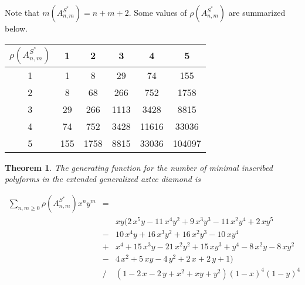 \documentclass[12pt]{article}
\newtheorem{theorem}{Theorem}
\theoremstyle{plain}
\theoremstyle{definition}
\theoremstyle{remark}
\theoremstyle{definition}
\begin{document}
Note that $m(A^{S^*}_{n,m}) = n+m+2$. Some values of $\rho(A^{S^*}_{n,m})$ are summarized below.

\begin{table}[h]
    \centering
    \begin{tabular}{|c|c|c|c|c|c|}
        \hline
        $\rho(A^{S^*}_{n,m})$ & 1 & 2 & 3 & 4 & 5 \\
        \hline
        1 & 1 & 8 & 29 & 74 & 155 \\
        \hline
        2 & 8 & 68 & 266 & 752 & 1758 \\
         \hline
        3 & 29 & 266 & 1113 & 3428 & 8815\\
         \hline
        4 & 74 & 752 & 3428 & 11616 & 33036\\
         \hline
        5 & 155 & 1758 & 8815& 33036 & 104097\\
         \hline
    \end{tabular}
    \label{tab:uhh}
\end{table}

\begin{theorem}
    The generating function for the number of minimal inscribed polyforms in the extended generalized aztec diamond is

    \begin{eqnarray*}
        \sum_{n,m\geq 0} \rho(A^{S^*}_{n,m})x^n y^m & = & \\
        & & xy(2 \, x^{5} y - 11 \, x^{4} y^{2} + 9 \, x^{3} y^{3} - 11 \, x^{2} y^{4} + 2 \, x y^{5} \\
        & - & 10 \, x^{4} y + 16 \, x^{3} y^{2} + 16 \, x^{2} y^{3} - 10 \, x y^{4}\\
        & + & x^{4} + 15 \, x^{3} y - 21 \, x^{2} y^{2} + 15 \, x y^{3} + y^{4} - 8 \, x^{2} y - 8 \, x y^{2} \\
        & - & 4 \, x^{2} + 5 \, x y - 4 \, y^{2} + 2 \, x + 2 \, y + 1 ) \\
        & / & {\left(1 - 2 \, x - 2 \, y + x^{2} + x y + y^{2} \right)} {\left(1-x\right)}^{4} {\left(1-y\right)}^{4}
    \end{eqnarray*}

\end{theorem}
\end{document}
